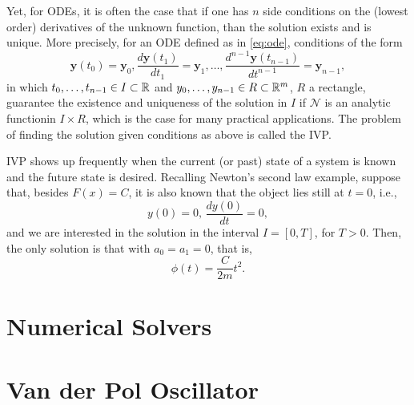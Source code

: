 Yet, for ODEs, it is often the case that if one has $n$ side conditions on the (lowest order) derivatives of the unknown function, than the solution exists and is unique. More precisely, for an ODE defined as in \eqref{eq:ode}, conditions of the form \[
\bm{y}\left( t_0 \right) =\bm{y}_0,\frac{d\bm{y}\left( t_1 \right) }{dt_1}=\bm{y}_1,\ldots,\frac{d^{n-1}\bm{y}\left( t_{n-1} \right) }{dt^{n-1}}= \bm{y}_{n-1}
,\] in which $t_0,\ldots,t_{n-1}\in I\subset \mathbb{R}$ and $y_0,\ldots,y_{n-1}\in R\subset \mathbb{R}^m$, $R$ a rectangle, guarantee the existence and uniqueness of the solution in $I$ if $\mathcal{N}$ is an analytic function\footnotemark in $I\times R$, which is the case for many practical applications.
The problem of finding the solution given conditions as above is called the \gls{IVP}.

\gls{IVP} shows up frequently when the current (or past) state of a system is known and the future state is desired.
Recalling Newton's second law example, suppose that, besides $F(x)=C$, it is also known that the object lies still at $t=0$, i.e., \[
y(0) = 0,\,\frac{d y(0)}{dt}=0
,\] and we are interested in the solution in the interval $I=\left[ 0,T \right] $, for $T>0$. Then, the only solution is that with $a_0=a_1=0$, that is, \[
    \phi\left( t \right) = \frac{C}{2m}t^2
.\] 

\section{Numerical Solvers}

\section{Van der Pol Oscillator}

